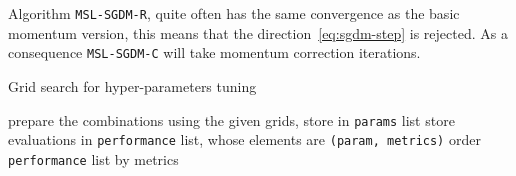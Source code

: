 



Algorithm \texttt{MSL-SGDM-R}, quite often has the same convergence as the basic momentum version, this means that the direction~\eqref{eq:sgdm-step} is rejected. As a consequence \texttt{MSL-SGDM-C} will take momentum correction iterations.


\begin{algorithm}
\caption{Grid search for hyper-parameters tuning}\label{alg:grid-search}
prepare the combinations using the given grids, store in \texttt{params} list\;
store evaluations in \texttt{performance} list, whose elements are \texttt{(param, metrics)}\;
order \texttt{performance} list by metrics\;
\end{algorithm}


